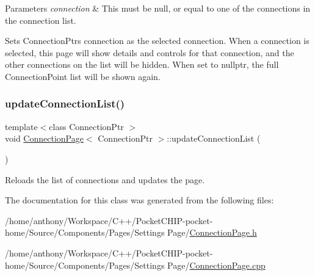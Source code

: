 \begin{DoxyParams}{Parameters}
{\em connection} & This must be null, or equal to one of the connections in the connection list.\\
\hline
\end{DoxyParams}
Sets Connection\+Ptr\textquotesingle{}s connection as the selected connection. When a connection is selected, this page will show details and controls for that connection, and the other connections on the list will be hidden. When set to nullptr, the full Connection\+Point list will be shown again. \mbox{\label{classConnectionPage_af228c013cf5fea9d4bb85892f92e8016}} 
\subsubsection{\texorpdfstring{update\+Connection\+List()}{updateConnectionList()}}
{\footnotesize\ttfamily template$<$class Connection\+Ptr $>$ \\
void \mbox{\hyperlink{classConnectionPage}{Connection\+Page}}$<$ Connection\+Ptr $>$\+::update\+Connection\+List (\begin{DoxyParamCaption}{ }\end{DoxyParamCaption})\hspace{0.3cm}{\ttfamily [protected]}}

Reloads the list of connections and updates the page. 

The documentation for this class was generated from the following files\+:\begin{DoxyCompactItemize}
\item 
/home/anthony/\+Workspace/\+C++/\+Pocket\+C\+H\+I\+P-\/pocket-\/home/\+Source/\+Components/\+Pages/\+Settings Page/\mbox{\hyperlink{ConnectionPage_8h}{Connection\+Page.\+h}}\item 
/home/anthony/\+Workspace/\+C++/\+Pocket\+C\+H\+I\+P-\/pocket-\/home/\+Source/\+Components/\+Pages/\+Settings Page/\mbox{\hyperlink{ConnectionPage_8cpp}{Connection\+Page.\+cpp}}\end{DoxyCompactItemize}
